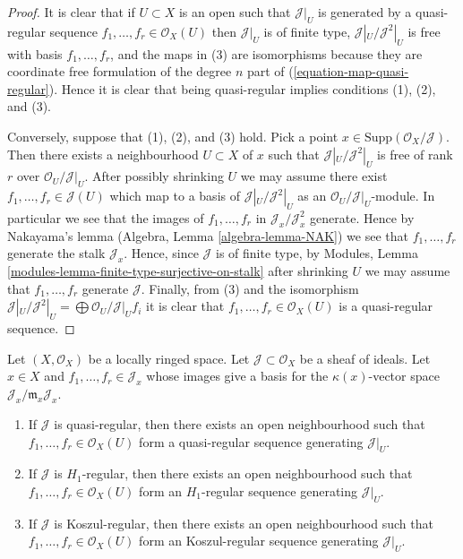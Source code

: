 \begin{proof}
It is clear that if $U \subset X$ is an open such that
$\mathcal{J}|_U$ is generated by a quasi-regular sequence
$f_1, \ldots, f_r \in \mathcal{O}_X(U)$ then $\mathcal{J}|_U$
is of finite type, $\mathcal{J}|_U/\mathcal{J}^2|_U$ is free
with basis $f_1, \ldots, f_r$, and the maps in (3) are isomorphisms
because they are coordinate free formulation of the degree $n$
part of (\ref{equation-map-quasi-regular}). Hence it is clear that
being quasi-regular implies conditions (1), (2), and (3).

\medskip\noindent
Conversely, suppose that (1), (2), and (3) hold. Pick a point
$x \in \text{Supp}(\mathcal{O}_X/\mathcal{J})$. Then there exists
a neighbourhood $U \subset X$ of $x$ such that
$\mathcal{J}|_U/\mathcal{J}^2|_U$
is free of rank $r$ over $\mathcal{O}_U/\mathcal{J}|_U$.
After possibly shrinking $U$ we may assume there exist
$f_1, \ldots, f_r \in \mathcal{J}(U)$ which map to a basis
of $\mathcal{J}|_U/\mathcal{J}^2|_U$ as an
$\mathcal{O}_U/\mathcal{J}|_U$-module.
In particular we see that the images of $f_1, \ldots, f_r$ in
$\mathcal{J}_x/\mathcal{J}^2_x$ generate. Hence by Nakayama's lemma
(Algebra, Lemma \ref{algebra-lemma-NAK})
we see that $f_1, \ldots, f_r$ generate the stalk $\mathcal{J}_x$.
Hence, since $\mathcal{J}$ is of finite type, by
Modules, Lemma \ref{modules-lemma-finite-type-surjective-on-stalk}
after shrinking $U$ we may assume that $f_1, \ldots, f_r$ generate
$\mathcal{J}$. Finally, from (3) and the isomorphism
$\mathcal{J}|_U/\mathcal{J}^2|_U = \bigoplus \mathcal{O}_U/\mathcal{J}|_U f_i$
it is clear that $f_1, \ldots, f_r \in \mathcal{O}_X(U)$
is a quasi-regular sequence.
\end{proof}

\begin{lemma}
\label{lemma-generate-regular-ideal}
Let $(X, \mathcal{O}_X)$ be a locally ringed space.
Let $\mathcal{J} \subset \mathcal{O}_X$ be a sheaf of ideals.
Let $x \in X$ and $f_1, \ldots, f_r \in \mathcal{J}_x$ whose images
give a basis for the $\kappa(x)$-vector space
$\mathcal{J}_x/\mathfrak m_x\mathcal{J}_x$.
\begin{enumerate}
\item If $\mathcal{J}$ is quasi-regular, then there exists an open
neighbourhood such that $f_1, \ldots, f_r \in \mathcal{O}_X(U)$
form a quasi-regular sequence generating $\mathcal{J}|_U$.
\item If $\mathcal{J}$ is $H_1$-regular, then there exists an open
neighbourhood such that $f_1, \ldots, f_r \in \mathcal{O}_X(U)$
form an $H_1$-regular sequence generating $\mathcal{J}|_U$.
\item If $\mathcal{J}$ is Koszul-regular, then there exists an open
neighbourhood such that $f_1, \ldots, f_r \in \mathcal{O}_X(U)$
form an Koszul-regular sequence generating $\mathcal{J}|_U$.
\end{enumerate}
\end{lemma}

